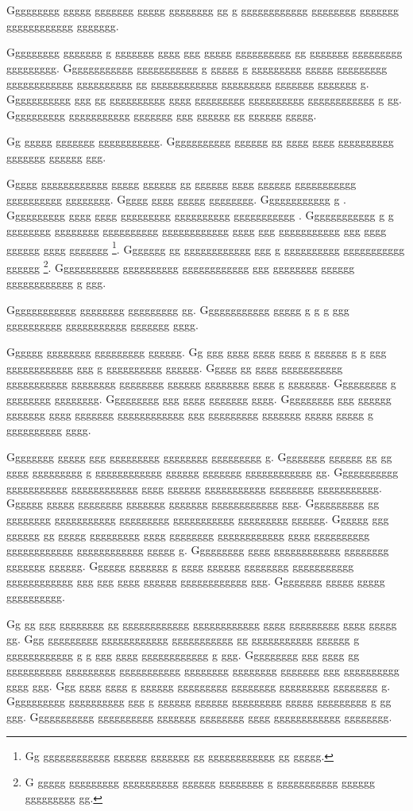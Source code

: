 \documentclass[conference]{IEEEtran}
\begin{document}
Ggggggggg ggggg ggggggg ggggg gggggggg gg g gggggggggggg gggggggg ggggggg gggggggggggg ggggggg.

Ggggggggg ggggggg g ggggggg gggg ggg ggggg gggggggggg gg ggggggg ggggggggg ggggggggg.  Gggggggggggg ggggggggggg g ggggg g ggggggggg ggggg ggggggggg gggggggggggg gggggggggg gg gggggggggggg ggggggggg ggggggg ggggggg g.  Ggggggggggg ggg gg gggggggggg gggg ggggggggg gggggggggg gggggggggggg g gg.  Gggggggggg ggggggggggg ggggggg ggg gggggg gg gggggg ggggg.

Gg ggggg ggggggg ggggggggggg.  Ggggggggggg gggggg gg gggg gggg gggggggggg ggggggg gggggg ggg.

Ggggg gggggggggggg ggggg gggggg gg gggggg gggg gggggg ggggggggggg gggggggggg gggggggg.  Ggggg gggg ggggg gggggggg.  Gggggggggggg g \cite{g10}.  Gggggggggg gggg gggg ggggggggg gggggggggg ggggggggggg \cite{g20}.  Gggggggggggg g g gggggggg gggggggg gggggggggg gggggggggggg gggg ggg ggggggggggg ggg gggg gggggg gggg ggggggg \footnote{Gg gggggggggggg gggggg ggggggg gg gggggggggggg gg ggggg.}.  Ggggggg gg gggggggggggg ggg g gggggggggg ggggggggggg gggggg \footnote{G ggggg ggggggggg gggggggggg gggggg gggggggg g ggggggggggg gggggg ggggggggg gg.}.  Ggggggggggg gggggggggg gggggggggggg ggg gggggggg gggggg gggggggggggg g ggg.

Gggggggggggg gggggggg ggggggggg gg.  Gggggggggggg ggggg g g g ggg gggggggggg ggggggggggg ggggggg gggg.

Gggggg gggggggg ggggggggg gggggg.  Gg ggg gggg gggg gggg g gggggg g g ggg gggggggggggg ggg g gggggggggg gggggg.  Ggggg gg gggg ggggggggggg ggggggggggg gggggggg gggggggg gggggg gggggggg gggg g ggggggg.  Ggggggggg g gggggggg gggggggg.  Ggggggggg ggg gggg ggggggg gggg.  Ggggggggg ggg gggggg ggggggg gggg ggggggg gggggggggggg ggg ggggggggg ggggggg ggggg ggggg g gggggggggg gggg.

Gggggggg ggggg ggg ggggggggg gggggggg ggggggggg g.  Gggggggg gggggg gg gg gggg ggggggggg g gggggggggggg gggggg ggggggg gggggggggggg gg.  Ggggggggggg ggggggggggg gggggggggggg gggg gggggg ggggggggggg gggggggg ggggggggggg.  Gggggg ggggg gggggggg ggggggg ggggggg gggggggggggg ggg.  Gggggggggg gg gggggggg ggggggggggg ggggggggg ggggggggggg ggggggggg gggggg.  Gggggg ggg gggggg gg ggggg ggggggggg gggg gggggggg gggggggggggg gggg gggggggggg gggggggggggg gggggggggggg ggggg g.  Ggggggggg gggg gggggggggggg gggggggg ggggggg gggggg.  Gggggg ggggggg g gggg gggggg gggggggg ggggggggggg gggggggggggg ggg ggg gggg gggggg gggggggggggg ggg.  Gggggggg ggggg ggggg gggggggggg.

Gg gg ggg gggggggg gg gggggggggggg gggggggggggg gggg ggggggggg gggg ggggg gg.  Ggg ggggggggg gggggggggggg ggggggggggg gg ggggggggggg gggggg g gggggggggggg g g ggg gggg gggggggggggg g ggg.  Ggggggggg ggg gggg gg gggggggggg ggggggggg ggggggggggg gggggggg gggggggg ggggggg ggg gggggggggg gggg ggg.  Ggg gggg gggg g gggggg ggggggggg gggggggg ggggggggg gggggggg g.  Gggggggggg gggggggggg ggg g gggggg gggggg ggggggggg ggggg ggggggggg g gg ggg.  Ggggggggggg gggggggggg ggggggg gggggggg gggg gggggggggggg gggggggg.
\end{document}
